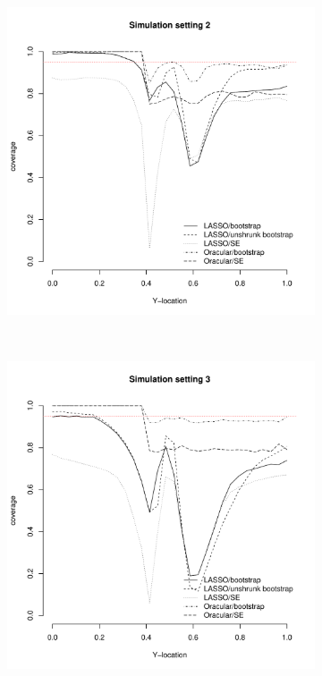 \documentclass[authoryear, review, 11pt]{elsarticle}
\begin{document}
\begin{figure}
\begin{subfigure}[b]{0.3\textwidth}
			\includegraphics[width=\textwidth]{../../figures/simulation/28-2-profile-coverage.pdf}
			\label{fig:tiger}
		\end{subfigure}
        ~ %
		\begin{subfigure}[b]{0.3\textwidth}
			\centering
			\includegraphics[width=\textwidth]{../../figures/simulation/28-3-profile-coverage.pdf}
			\label{fig:mouse}
		\end{subfigure}
	\end{figure}
	
\end{document}
